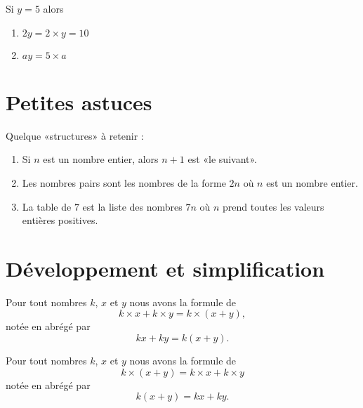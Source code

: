 \begin{example}
    Si \( y=5\) alors
    \begin{enumerate}
        \item
            \( 2y=2\times y=10\)
        \item
            \( ay=5\times a\)
    \end{enumerate}
\end{example}

\section{Petites astuces}

Quelque «structures» à retenir :
\begin{enumerate}
    \item
        Si \( n\) est un nombre entier, alors \( n+1\) est «le suivant».
    \item
        Les nombres pairs sont les nombres de la forme \( 2n\) où \( n\) est un nombre entier.
    \item
        La table de \( 7\) est la liste des nombres \( 7n\) où \( n\) prend toutes les valeurs entières positives.
\end{enumerate}

\section{Développement et simplification}



\begin{Aretenir}
    Pour tout nombres \( k\), \( x\) et \( y\) nous avons la formule de 
    \begin{equation}
        k\times x+k\times y=k\times (x+y),
    \end{equation}
    notée en abrégé par
    \begin{equation}
        kx+ky=k(x+y).
    \end{equation}
\end{Aretenir}

\begin{Aretenir}
    Pour tout nombres \( k\), \( x\) et \( y\) nous avons la formule de 
    \begin{equation}
        k\times (x+y)=k\times x+k\times y
    \end{equation}
    notée en abrégé par
    \begin{equation}
        k(x+y)=kx+ky.
    \end{equation}
\end{Aretenir}

